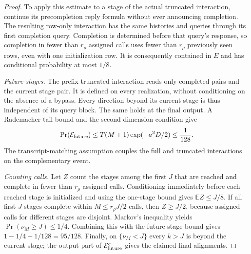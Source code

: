 \documentclass[11pt,a4paper]{article}
\newcommand{\E}{\mathbb{E}}
\theoremstyle{remark}
\begin{document}
\begin{proof}
To apply this estimate to a stage of the actual truncated interaction,
continue its precompletion reply formula without ever announcing
completion.  The resulting row-only interaction has the same histories
and queries through its first completion query.  Completion is determined
before that query's response, so completion in fewer than $r_\rho$
assigned calls uses fewer than $r_\rho$ previously seen rows, even with
one initialization row.  It is consequently contained in $E$ and has
conditional probability at most $1/8$.

\emph{Future stages.}
The prefix-truncated interaction reads only completed pairs and the current
stage pair.  It is defined on every realization, without conditioning on
the absence of a bypass.  Every direction beyond its current stage is thus
independent of its query block.  The same holds at the final output.
A Rademacher tail bound and the second dimension condition give
\[
 \Pr(\mathcal E_{\rm future})
 \le T(M+1)\exp(-a^2D/2)\le\frac1{128}.
\]
The transcript-matching assumption couples the full and truncated
interactions on the complementary event.

\emph{Counting calls.}
Let $Z$ count the stages among the first $J$ that are reached and complete
in fewer than $r_\rho$ assigned calls.  Conditioning immediately before
each reached stage is initialized and using the one-stage bound gives
$\E Z\le J/8$.  If all first $J$ stages complete within
$M\le r_\rho J/2$ calls, then $Z\ge J/2$, because assigned calls for
different stages are disjoint.  Markov's inequality yields
$\Pr(\nu_M\ge J)\le1/4$.  Combining this with the future-stage bound
gives $1-1/4-1/128=95/128$.  Finally, on $\{\nu_M<J\}$ every $k>J$
is beyond the current stage; the output part of
$\mathcal E_{\rm future}^{c}$ gives the claimed final alignments.
\end{proof}
\end{document}
